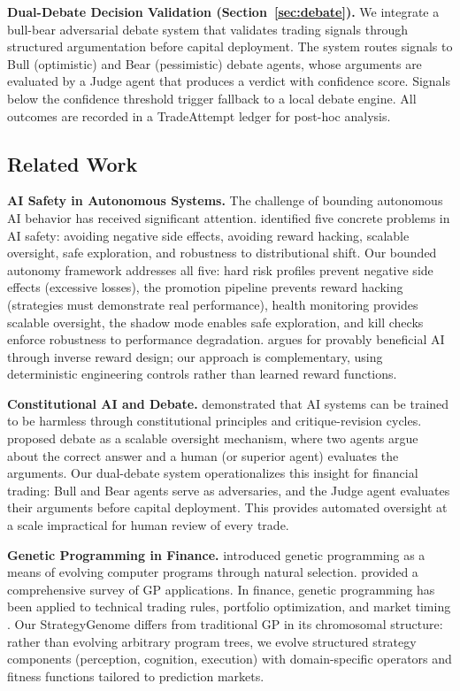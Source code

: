 \documentclass[11pt]{article}
\begin{document}
\textbf{Dual-Debate Decision Validation (Section~\ref{sec:debate}).} We integrate a bull-bear adversarial debate system that validates trading signals through structured argumentation before capital deployment. The system routes signals to Bull (optimistic) and Bear (pessimistic) debate agents, whose arguments are evaluated by a Judge agent that produces a verdict with confidence score. Signals below the confidence threshold trigger fallback to a local debate engine. All outcomes are recorded in a TradeAttempt ledger for post-hoc analysis.

\subsection{Related Work}\label{sec:related}

\textbf{AI Safety in Autonomous Systems.} The challenge of bounding autonomous AI behavior has received significant attention. \citet{amodei2016concrete} identified five concrete problems in AI safety: avoiding negative side effects, avoiding reward hacking, scalable oversight, safe exploration, and robustness to distributional shift. Our bounded autonomy framework addresses all five: hard risk profiles prevent negative side effects (excessive losses), the promotion pipeline prevents reward hacking (strategies must demonstrate real performance), health monitoring provides scalable oversight, the shadow mode enables safe exploration, and kill checks enforce robustness to performance degradation. \citet{russell2020human} argues for provably beneficial AI through inverse reward design; our approach is complementary, using deterministic engineering controls rather than learned reward functions.

\textbf{Constitutional AI and Debate.} \citet{bai2022constitutional} demonstrated that AI systems can be trained to be harmless through constitutional principles and critique-revision cycles. \citet{irving2018ai} proposed debate as a scalable oversight mechanism, where two agents argue about the correct answer and a human (or superior agent) evaluates the arguments. Our dual-debate system operationalizes this insight for financial trading: Bull and Bear agents serve as adversaries, and the Judge agent evaluates their arguments before capital deployment. This provides automated oversight at a scale impractical for human review of every trade.

\textbf{Genetic Programming in Finance.} \citet{koza1992genetic} introduced genetic programming as a means of evolving computer programs through natural selection. \citet{poli2008field} provided a comprehensive survey of GP applications. In finance, genetic programming has been applied to technical trading rules, portfolio optimization, and market timing \citep{lopez2018advances}. Our StrategyGenome differs from traditional GP in its chromosomal structure: rather than evolving arbitrary program trees, we evolve structured strategy components (perception, cognition, execution) with domain-specific operators and fitness functions tailored to prediction markets.
\end{document}
